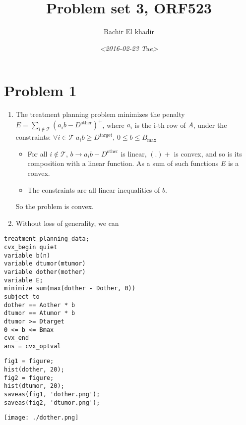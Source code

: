 \documentclass[11pt]{article}
\author{Bachir El khadir}
\date{\textit{<2016-02-23 Tue>}}
\title{Problem set 3, ORF523}
\begin{document}
\maketitle
\begin{HTML}

\label{orgspecialblock1}

\end{HTML}

\section{Problem 1}
\label{sec:orgheadline1}
\begin{enumerate}
\item The treatment planning problem minimizes the penalty \(E = \sum_{i \not \in \mathcal T} (a_i b - D^{\text{other}})^+\), where \(a_i\) is the i-th row of \(A\),  under the constraints: \(\forall i \in \mathcal T\; a_i b \ge D^{\text{target}}\), \(0 \le b \le B_{\max}\)
\begin{itemize}
\item For all \(i \not \in \mathcal T\), \(b \rightarrow a_ib - D^{\text{other}}\) is linear, \((.)+\) is convex, and so is its composition with a linear function. As a sum of such functions \(E\) is a convex.
\item The constraints are all linear inequalities of \(b\).
\end{itemize}
So the problem is convex.
\item Without loss of generality, we can
\end{enumerate}

\begin{verbatim}
treatment_planning_data;
cvx_begin quiet
variable b(n)
variable dtumor(mtumor)
variable dother(mother)
variable E;
minimize sum(max(dother - Dother, 0))
subject to
dother == Aother * b
dtumor == Atumor * b
dtumor >= Dtarget
0 <= b <= Bmax
cvx_end
ans = cvx_optval
\end{verbatim}



\begin{verbatim}
fig1 = figure;
hist(dother, 20);
fig2 = figure;
hist(dtumor, 20);
saveas(fig1, 'dother.png');
saveas(fig2, 'dtumor.png');
\end{verbatim}



\begin{center}
\texttt{[image: ./dother.png]}
\end{center}
\end{document}
